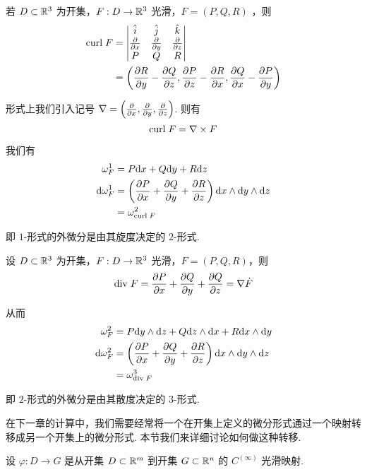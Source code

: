 \begin{example}[ 旋度]
    若 $D\subset\mathbb{R}^3$ 为开集，$F:D\to\mathbb{R}^3$ 光滑，$F=(P,Q,R)$ ，则
$$
\begin{aligned}
\mathrm{curl}\; F&=\begin{vmatrix}
    \hat{i} & \hat{j} & \hat{k}\\
    \frac{\partial{}}{\partial{x}} & \frac{\partial{}}{\partial{y}} & \frac{\partial{}}{\partial{z}}\\
    P & Q & R
\end{vmatrix}\\
&=\left(\frac{\partial{R}}{\partial{y}}-\frac{\partial{Q}}{\partial{z}},\frac{\partial{P}}{\partial{z}}-\frac{\partial{R}}{\partial{x}},\frac{\partial{Q}}{\partial{x}}-\frac{\partial{P}}{\partial{y}}\right)
\end{aligned}
$$

    形式上我们引入记号 $\nabla=\left(\frac{\partial{}}{\partial{x}},\frac{\partial{}}{\partial{y}},\frac{\partial{}}{\partial{z}}\right)$. 则有
$$
\mathrm{curl}\; F=\nabla\times F
$$

    我们有
$$
\begin{aligned}
\omega_F^1&=P\mathrm{d} x+Q\mathrm{d} y+R\mathrm{d} z\\
\mathrm{d}\omega_F^1&=\left(\frac{\partial{P}}{\partial{x}}+\frac{\partial{Q}}{\partial{y}}+\frac{\partial{R}}{\partial{z}}\right)\mathrm{d} x\wedge\mathrm{d} y\wedge\mathrm{d} z\\
&=\omega_{\mathrm{curl}\; F}^2
\end{aligned}
$$

    即 $1$-形式的外微分是由其旋度决定的 $2$-形式.
\end{example}

\begin{example}[ 散度]
    设 $D\subset\mathbb{R}^3$ 为开集，$F:D\to\mathbb{R}^3$ 光滑，$F=(P,Q,R)$，则
$$
\mathrm{div}\; F=\frac{\partial{P}}{\partial{x}}+\frac{\partial{Q}}{\partial{y}}+\frac{\partial{Q}}{\partial{z}}=\nabla\dot F
$$

    从而
$$
\begin{aligned}
    \omega_{F}^2&=P\mathrm{d} y\wedge\mathrm{d} z+Q\mathrm{d} z\wedge\mathrm{d} x+R\mathrm{d} x\wedge\mathrm{d} y\\
    \mathrm{d}\omega_F^2&=\left(\frac{\partial{P}}{\partial{x}}+\frac{\partial{Q}}{\partial{y}}+\frac{\partial{R}}{\partial{z}}\right)\mathrm{d} x\wedge\mathrm{d} y\wedge\mathrm{d} z\\
    &=\omega_{\mathrm{div}\; F}^3
\end{aligned}
$$

    即 $2$-形式的外微分是由其散度决定的 $3$-形式.
\end{example}


在下一章的计算中，我们需要经常将一个在开集上定义的微分形式通过一个映射转移成另一个开集上的微分形式. 本节我们来详细讨论如何做这种转移.

设 $\varphi:D\to G$ 是从开集 $D\subset\mathbb{R}^m$ 到开集 $G\subset\mathbb{R}^n$ 的 $C^{(\infty)}$ 光滑映射.

